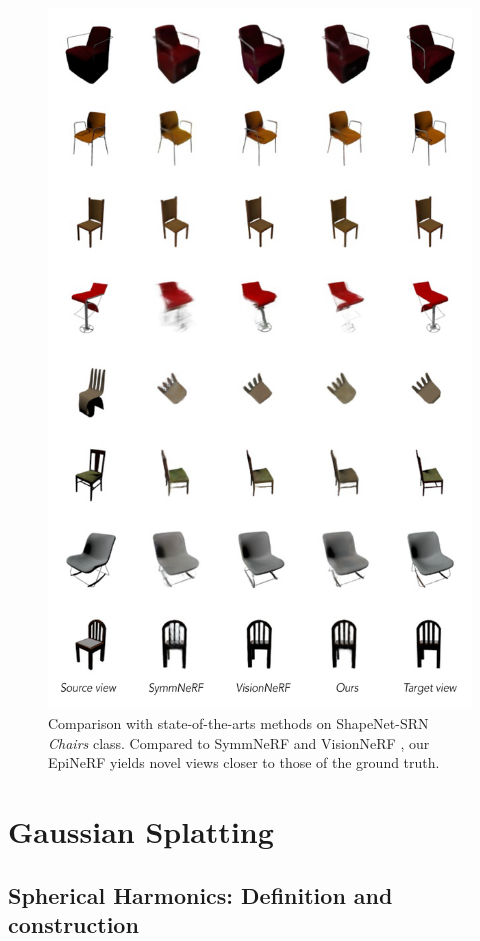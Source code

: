 \begin{figure}[htp!]
    \center
  \includegraphics[width=.9\linewidth]{images/epinerf/supp_chairs_ex.png}
  \caption{Comparison with state-of-the-arts methods on ShapeNet-SRN \textit{Chairs} class.   
 Compared to SymmNeRF \citep{li2022symmnerf} and VisionNeRF \citep{lin2023vision}, our EpiNeRF yields novel views closer to those of the ground truth.}
  \label{fig:supp_chairs}
\end{figure}

\section{Gaussian Splatting}
\subsection{Spherical Harmonics: Definition and construction}
\label{appendix:gs-sh}

